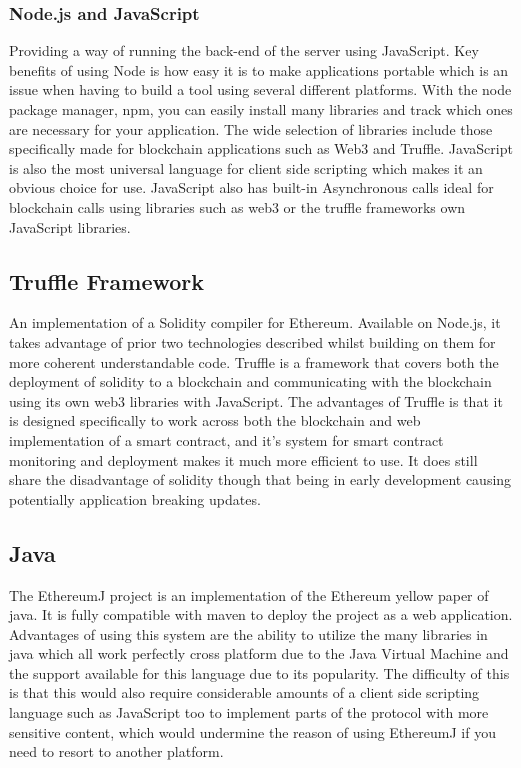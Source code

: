 \documentclass{entcs}
\begin{document}
\subsubsection{Node.js and JavaScript}
Providing a way of running the back-end of the server using JavaScript. Key benefits of using Node is how easy it is to make applications portable which is an issue when having to build a tool using several different platforms. With the node package manager, npm, you can easily install many libraries and track which ones are necessary for your application. The wide selection of libraries include those specifically made for blockchain applications such as Web3 and Truffle.
JavaScript is also the most universal language for client side scripting which makes it an obvious choice for use. JavaScript also has built-in Asynchronous calls ideal for blockchain calls using libraries such as web3 or the truffle frameworks own JavaScript libraries. 

\subsection{Truffle Framework}
An implementation of a Solidity compiler for Ethereum. Available on Node.js, it takes advantage of prior two technologies described whilst building on them for more coherent understandable code. Truffle \cite{truffle} is a framework that covers both the deployment of solidity to a blockchain and communicating with the blockchain using its own web3 libraries with JavaScript. The advantages of Truffle is that it is designed specifically to work across both the blockchain and web implementation of a smart contract, and it's system for smart contract monitoring and deployment makes it much more efficient to use. It does still share the disadvantage of solidity though that being in early development causing potentially application breaking updates.

\subsection{Java}
The EthereumJ project is an implementation of the Ethereum yellow paper of java. It is fully compatible with maven to deploy the project as a web application. Advantages of using this system are the ability to utilize the many libraries in java which all work perfectly cross platform due to the Java Virtual Machine and the support available for this language due to its popularity. The difficulty of this is that this would also require considerable amounts of a client side scripting language such as JavaScript too to implement parts of the protocol with more sensitive content, which would undermine the reason of using EthereumJ if you need to resort to another platform. 
\end{document}
